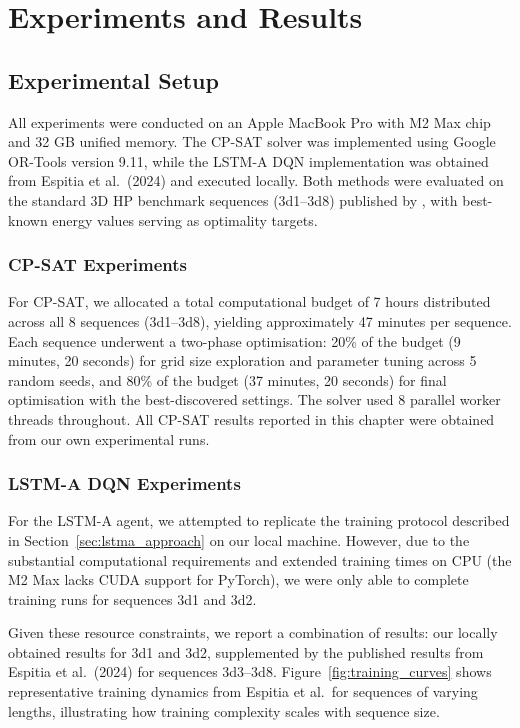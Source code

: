 \documentclass[12pt, oneside, openany]{book}
\theoremstyle{plain}
\theoremstyle{definition}
\begin{document}
\chapter{Experiments and Results}
\label{chap:results}

\section{Experimental Setup}

All experiments were conducted on an Apple MacBook Pro with M2 Max chip and 32 GB unified memory. The CP-SAT solver was implemented using Google OR-Tools version 9.11, while the LSTM-A DQN implementation was obtained from Espitia et al.\ (2024) \cite{Espitia2024} and executed locally. Both methods were evaluated on the standard 3D HP benchmark sequences (3d1--3d8) published by \cite{Espitia2024}, with best-known energy values serving as optimality targets.

\subsection{CP-SAT Experiments}

For CP-SAT, we allocated a total computational budget of 7 hours distributed across all 8 sequences (3d1--3d8), yielding approximately 47 minutes per sequence. Each sequence underwent a two-phase optimisation: 20\% of the budget (9 minutes, 20 seconds) for grid size exploration and parameter tuning across 5 random seeds, and 80\% of the budget (37 minutes, 20 seconds) for final optimisation with the best-discovered settings. The solver used 8 parallel worker threads throughout. All CP-SAT results reported in this chapter were obtained from our own experimental runs.

\subsection{LSTM-A DQN Experiments}

For the LSTM-A agent, we attempted to replicate the training protocol described in Section~\ref{sec:lstma_approach} on our local machine. However, due to the substantial computational requirements and extended training times on CPU (the M2 Max lacks CUDA support for PyTorch), we were only able to complete training runs for sequences 3d1 and 3d2. 

Given these resource constraints, we report a combination of results: our locally obtained results for 3d1 and 3d2, supplemented by the published results from Espitia et al.\ (2024) for sequences 3d3--3d8. Figure~\ref{fig:training_curves} shows representative training dynamics from Espitia et al.\ for sequences of varying lengths, illustrating how training complexity scales with sequence size.
\end{document}
